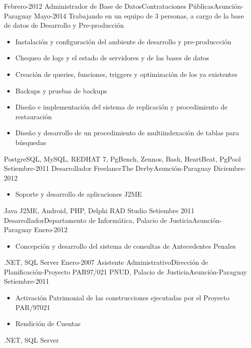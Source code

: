 \begin{experiences}
  \projectexperiences
    {Febrero-2012}   {Administrador de Base de Datos}{Contrataciones Públicas}{Asunción-Paraguay}
    {Mayo-2014}
                {
                  Trabajando en un equipo de 3 personas, a cargo de la base de datos de Desarrollo y Pre-producción
                }
    {
                      \begin{itemize}
                        \item Instalación y configuración del ambiente de desarrollo y pre-produccción
                        \item Chequeo de logs y el estado de servidores y de las bases de datos
                        \item Creación de queries, funciones, triggers y optimización de los ya existentes
                        \item Backups y pruebas de backups
                        \item Diseño e implementación del sistema de replicación y procedimiento de restauración
                        \item Diseño y desarrollo de un procedimiento de multiindexación de tablas para búsquedas
                      \end{itemize}
				}
                {PostgreSQL, MySQL, REDHAT 7, PgBench, Zennos, Bash, HeartBeat, PgPool}
  \emptySeparator
  \experience
    {Setiembre-2011}   {Desarrollador Freelance}{The Derby}{Asunción-Paraguay}
    {Diciembre-2012} {
                      \begin{itemize}
                        \item Soporte y desarrollo de aplicaciones J2ME
                      \end{itemize}
				}
                {Java J2ME, Android, PHP, Delphi RAD Studio}
  \emptySeparator
  \experience
    {Setiembre 2011}   {Desarrollador}{Departamento de Informática, Palacio de Justicia}{Asunción-Paraguay}
    {Enero-2012} {
                      \begin{itemize}
                        \item Concepción y desarrollo del sistema de consultas de Antecedentes Penales
                      \end{itemize}
				}
                {.NET, SQL Server}
  \emptySeparator
  \experience
    {Enero-2007}   {Asistente Administrativo}{Dirección de Planificación-Proyecto PAR97/021 PNUD, Palacio de Justicia}{Asunción-Paraguay}
    {Setiembre-2011}
      {
                      \begin{itemize}
                        \item Activación Patrimonial de las construcciones ejecutadas por el Proyecto PAR/97021
                        \item Rendición de Cuentas
                      \end{itemize}
			}
                {.NET, SQL Server}
  \emptySeparator
\end{experiences}
